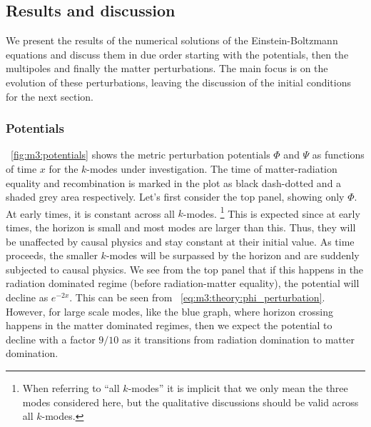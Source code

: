 \subsection{Results and discussion}\label{sec:m3:results}
    We present the results of the numerical solutions of the Einstein-Boltzmann equations and discuss them in due order starting with the potentials, then the multipoles and finally the matter perturbations. The main focus is on the evolution of these perturbations, leaving the discussion of the initial conditions for the next section. 

\subsubsection{Potentials}
    ~\cref{fig:m3:potentials} shows the metric perturbation potentials $\Phi$ and $\Psi$ as functions of time $x$ for the $k$-modes under investigation. The time of matter-radiation equality and recombination is marked in the plot as black dash-dotted and a shaded grey area respectively. Let's first consider the top panel, showing only $\Phi$. At early times, it is constant across all $k$-modes. \footnote{When referring to ``all $k$-modes'' it is implicit that we only mean the three modes considered here, but the qualitative discussions should be valid across all $k$-modes.} This is expected since at early times, the horizon is small and most modes are larger than this. Thus, they will be unaffected by causal physics and stay constant at their initial value. As time proceeds, the smaller $k$-modes will be surpassed by the horizon and are suddenly subjected to causal physics. We see from the top panel that if this happens in the radiation dominated regime (before radiation-matter equality), the potential will decline as $e^{-2x}$. This can be seen from ~\cref{eq:m3:theory:phi_perturbation}. However, for large scale modes, like the blue graph, where horizon crossing happens in the matter dominated regimes, then we expect the potential to decline with a factor $9/10$ as it transitions from radiation domination to matter domination. 
    
